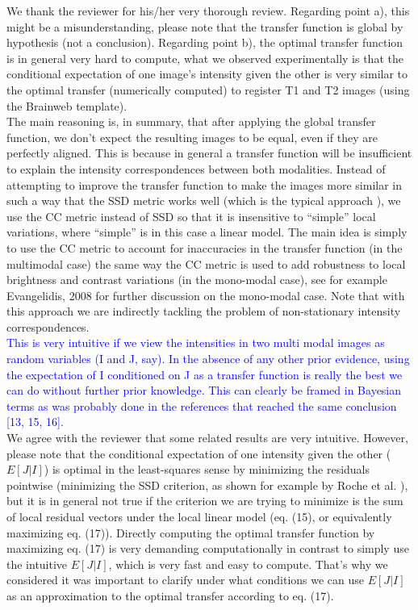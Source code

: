 \documentclass[onecolumn]{IEEEtran}
\begin{document}
We thank the reviewer for his/her very thorough review. Regarding point a), this might be a misunderstanding, please note that the transfer function is global by hypothesis (not a conclusion). Regarding point b), the optimal transfer function is in general very hard to compute, what we observed experimentally is that the conditional expectation of one image’s intensity given the other is very similar to the optimal transfer (numerically computed) to register T1 and T2 images (using the Brainweb template).\\

The main reasoning is, in summary, that after applying the global transfer function, we don’t expect the resulting images to be equal, even if they are perfectly aligned. This is because in general a transfer function will be insufficient to explain the intensity correspondences between both modalities. Instead of attempting to improve the transfer function to make the images more similar in such a way that the SSD metric works well (which is the typical approach \cite{Roche1998,Guimond2001,Arce-santana2014}), we use the CC metric instead of SSD so that it is insensitive to “simple” local variations, where  “simple” is in this case a linear model. The main idea is simply to use the CC metric to account for inaccuracies in the transfer function (in the multimodal case) the same way the CC metric is used to add robustness to local brightness and contrast variations (in the mono-modal case), see for example Evangelidis, 2008 \cite{Evangelidis2008} for further discussion on the mono-modal case. Note that with this approach we are indirectly tackling the problem of non-stationary intensity correspondences.\\

\textcolor{blue}{This is very intuitive if we view the intensities in two multi modal images as random variables (I and J, say). In the absence of any other prior evidence, using the expectation of I conditioned on J as a transfer function is really the best we can do without further prior knowledge. This can clearly be framed in Bayesian terms as was probably done in the references that reached the same conclusion [13, 15, 16].}\\

We agree with the reviewer that some related results are very intuitive. However, please note that the conditional expectation of one intensity given the other ($E[J|I]$) is optimal in the least-squares sense by minimizing the residuals pointwise (minimizing the SSD criterion, as shown for example by Roche et al. \cite{Roche1998}), but it is in general not true if the criterion we are trying to minimize is the sum of local residual vectors under the local linear model (eq. (15), or equivalently maximizing eq. (17)). Directly computing the optimal transfer function by maximizing eq. (17) is very demanding computationally in contrast to simply use the intuitive $E[J|I]$, which is very fast and easy to compute. That’s why we considered it was important to clarify under what conditions we can use $E[J|I]$ as an approximation to the optimal transfer according to eq. (17).\\
\end{document}
